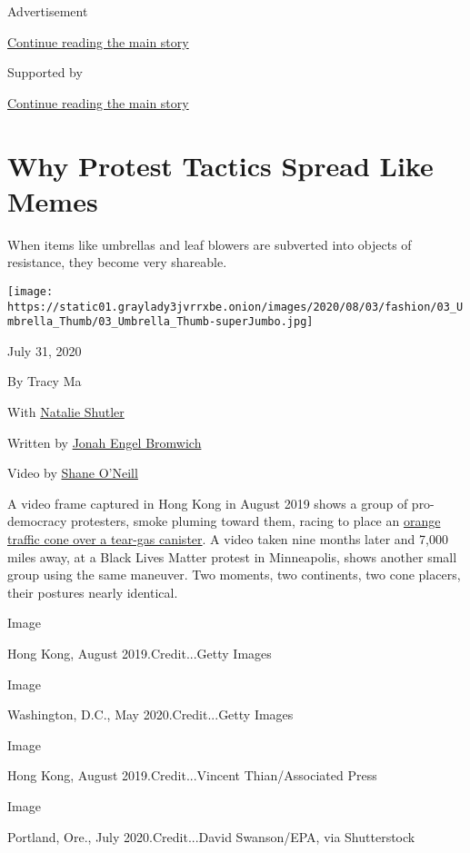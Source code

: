 Advertisement

\protect\hyperlink{after-top}{Continue reading the main story}

Supported by

\protect\hyperlink{after-sponsor}{Continue reading the main story}

\hypertarget{why-protest-tactics-spread-like-memes}{%
\section{Why Protest Tactics Spread Like
Memes}\label{why-protest-tactics-spread-like-memes}}

When items like umbrellas and leaf blowers are subverted into objects of
resistance, they become very shareable.

\texttt{[image: https://static01.graylady3jvrrxbe.onion/images/2020/08/03/fashion/03\_Umbrella\_Thumb/03\_Umbrella\_Thumb-superJumbo.jpg]}

July 31, 2020

By Tracy Ma

With
\href{https://www.nytimes3xbfgragh.onion/by/natalie-shutler}{Natalie
Shutler}

Written by
\href{https://www.nytimes3xbfgragh.onion/by/jonah-engel-bromwich}{Jonah
Engel Bromwich}

Video by \href{https://www.nytimes3xbfgragh.onion/by/shane-oneill}{Shane
O'Neill}

A video frame captured in Hong Kong in August 2019 shows a group of
pro-democracy protesters, smoke pluming toward them, racing to place an
\href{https://slate.com/news-and-politics/2019/06/hong-kong-tear-gas-water-bottle.html}{orange
traffic cone over a tear-gas canister}. A video taken nine months later
and 7,000 miles away, at a Black Lives Matter protest in Minneapolis,
shows another small group using the same maneuver. Two moments, two
continents, two cone placers, their postures nearly identical.

Image

Hong Kong, August 2019.Credit...Getty Images

Image

Washington, D.C., May 2020.Credit...Getty Images

Image

Hong Kong, August 2019.Credit...Vincent Thian/Associated Press

Image

Portland, Ore., July 2020.Credit...David Swanson/EPA, via Shutterstock

